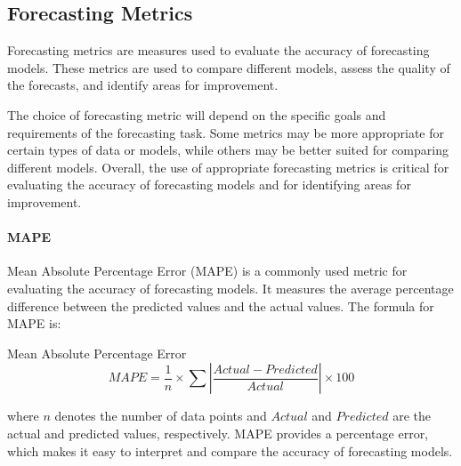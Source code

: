   
  \subsection{Forecasting Metrics}
  \label{sec:forecasting-metrics-evaluation-setup}

    Forecasting metrics \cite{botchkarevPerformanceMetricsError2018} are measures used to evaluate the accuracy of forecasting models. These metrics are used to compare different models, assess the quality of the forecasts, and identify areas for improvement.





    The choice of forecasting metric will depend on the specific goals and requirements of the forecasting task. Some metrics may be more appropriate for certain types of data or models, while others may be better suited for comparing different models.
    Overall, the use of appropriate forecasting metrics is critical for evaluating the accuracy of forecasting models and for identifying areas for improvement.

    \paragraph{MAPE}
    \label{par:mape-metrics-evaluation}
      Mean Absolute Percentage Error (MAPE) \cite{demyttenaereMeanAbsolutePercentage2016} is a commonly used metric for evaluating the accuracy of forecasting models. It measures the average percentage difference between the predicted values and the actual values.
      The formula for MAPE is:

      \begin{definition}{Mean Absolute Percentage Error}
        $$MAPE = \frac{1}{n} \times \sum \left|\frac{Actual - Predicted}{Actual}\right| \times 100$$
      \end{definition}
      where $n$ denotes the number of data points and $Actual$ and $Predicted$ are the actual and predicted values, respectively.
      MAPE provides a percentage error, which makes it easy to interpret and compare the accuracy of forecasting models. 
      
